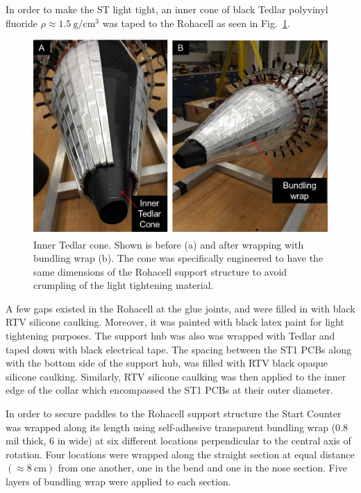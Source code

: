 In order to make the ST light tight, an inner cone of black Tedlar polyvinyl fluoride $\rho \approx 1.5\ \mathrm{g/cm^{3}}$ \cite{tedlar_pvf} was taped to the Rohacell as seen in Fig.~\ref{fig:light_tightening_cone}. 
\begin{figure}[!htb]
	\centering
	\includegraphics[width=1.0\columnwidth]{fabrication/figs/st_lt_ic_bw}
	\caption{Inner Tedlar cone.  Shown is before (a) and after wrapping with bundling wrap (b).  The cone was specifically engineered to have the same dimensions of the Rohacell support structure to avoid crumpling of the light tightening material.}
	\label{fig:light_tightening_cone}
\end{figure}
A few gaps existed in the Rohacell at the glue joints, and were filled in with black RTV silicone caulking. Moreover, it was painted with black latex paint for light tightening purposes.  The support hub was also was wrapped with Tedlar and taped down with black electrical tape. The spacing between the ST1 PCBs along with the bottom side of the support hub, was filled with RTV black opaque silicone caulking.  Similarly, RTV silicone caulking was then applied to the inner edge of the collar which encompassed the ST1 PCBs at their outer diameter.

In order to secure paddles to the Rohacell support structure the Start Counter was wrapped along its length using self-adhesive transparent bundling wrap (0.8 mil thick, 6 in wide) at six different locations perpendicular to the central axis of rotation. Four locations were wrapped along the straight section at equal distance $(\approx 8\ \mathrm{cm})$ from one another, one in the bend and one in the nose section.  Five layers of bundling wrap were applied to each section.%


